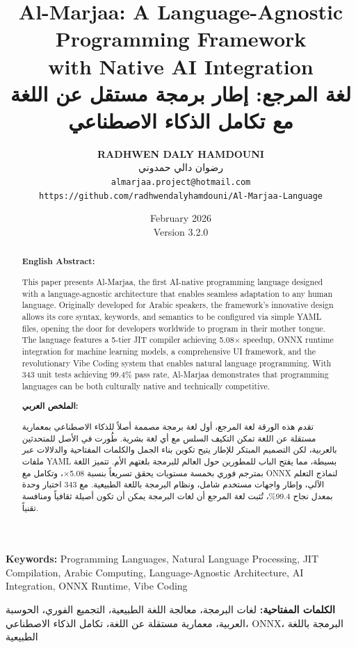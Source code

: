 \documentclass[11pt,a4paper]{article}
\title{
    \textbf{Al-Marjaa: A Language-Agnostic Programming Framework\\
    with Native AI Integration}\\[0.5em]
    \large\textarabic{لغة المرجع: إطار برمجة مستقل عن اللغة مع تكامل الذكاء الاصطناعي}
}
\author{
    \textbf{RADHWEN DALY HAMDOUNI}\\
    \textarabic{رضوان دالي حمدوني}\\[0.5em]
    \texttt{almarjaa.project@hotmail.com}\\
    \texttt{https://github.com/radhwendalyhamdouni/Al-Marjaa-Language}
}
\date{February 2026 \\ Version 3.2.0}
\begin{document}

\maketitle

\begin{abstract}
\noindent\textbf{English Abstract:}

This paper presents Al-Marjaa, the first AI-native programming language designed with a language-agnostic architecture that enables seamless adaptation to any human language. Originally developed for Arabic speakers, the framework's innovative design allows its core syntax, keywords, and semantics to be configured via simple YAML files, opening the door for developers worldwide to program in their mother tongue. The language features a 5-tier JIT compiler achieving 5.08$\times$ speedup, ONNX runtime integration for machine learning models, a comprehensive UI framework, and the revolutionary Vibe Coding system that enables natural language programming. With 343 unit tests achieving 99.4\% pass rate, Al-Marjaa demonstrates that programming languages can be both culturally native and technically competitive.

\vspace{1em}
\noindent\textbf{\textarabic{الملخص العربي:}}

\textarabic{تقدم هذه الورقة لغة المرجع، أول لغة برمجة مصممة أصلاً للذكاء الاصطناعي بمعمارية مستقلة عن اللغة تمكن التكيف السلس مع أي لغة بشرية. طُورت في الأصل للمتحدثين بالعربية، لكن التصميم المبتكر للإطار يتيح تكوين بناء الجمل والكلمات المفتاحية والدلالات عبر ملفات YAML بسيطة، مما يفتح الباب للمطورين حول العالم للبرمجة بلغتهم الأم. تتميز اللغة بمترجم فوري بخمسة مستويات يحقق تسريعاً بنسبة 5.08$\times$، وتكامل مع ONNX لنماذج التعلم الآلي، وإطار واجهات مستخدم شامل، ونظام البرمجة باللغة الطبيعية. مع 343 اختبار وحدة بمعدل نجاح 99.4\%، تُثبت لغة المرجع أن لغات البرمجة يمكن أن تكون أصيلة ثقافياً ومنافسة تقنياً.}
\end{abstract}

\vspace{1em}
\noindent\textbf{Keywords:} Programming Languages, Natural Language Processing, JIT Compilation, Arabic Computing, Language-Agnostic Architecture, AI Integration, ONNX Runtime, Vibe Coding

\vspace{0.5em}
\noindent\textbf{\textarabic{الكلمات المفتاحية:}} \textarabic{لغات البرمجة، معالجة اللغة الطبيعية، التجميع الفوري، الحوسبة العربية، معمارية مستقلة عن اللغة، تكامل الذكاء الاصطناعي، ONNX، البرمجة باللغة الطبيعية}
\end{document}
